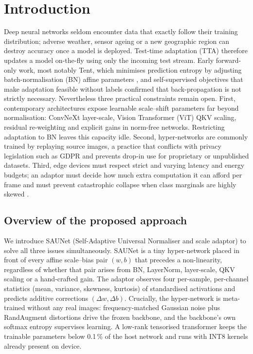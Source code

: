 \documentclass{article}
\begin{document}
\section{Introduction}
Deep neural networks seldom encounter data that exactly follow their training distribution; adverse weather, sensor ageing or a new geographic region can destroy accuracy once a model is deployed. Test-time adaptation (TTA) therefore updates a model on-the-fly using only the incoming test stream. Early forward-only work, most notably Tent, which minimises prediction entropy by adjusting batch-normalisation (BN) affine parameters \cite{wang-2020-tent}, and self-supervised objectives that make adaptation feasible without labels \cite{sun-2019-test} confirmed that back-propagation is not strictly necessary. Nevertheless three practical constraints remain open. First, contemporary architectures expose learnable scale–shift parameters far beyond normalisation: ConvNeXt layer-scale, Vision Transformer (ViT) QKV scaling, residual re-weighting and explicit gains in norm-free networks. Restricting adaptation to BN leaves this capacity idle. Second, hyper-networks are commonly trained by replaying source images, a practice that conflicts with privacy legislation such as GDPR and prevents drop-in use for proprietary or unpublished datasets. Third, edge devices must respect strict and varying latency and energy budgets; an adaptor must decide how much extra computation it can afford per frame and must prevent catastrophic collapse when class marginals are highly skewed \cite{alfarra-2023-evaluation}.

\subsection{Overview of the proposed approach}
We introduce SAUNet (Self-Adaptive Universal Normaliser and scale adaptor) to solve all three issues simultaneously. SAUNet is a tiny hyper-network placed in front of every affine scale–bias pair \((w,b)\) that precedes a non-linearity, regardless of whether that pair arises from BN, LayerNorm, layer-scale, QKV scaling or a hand-crafted gain. The adaptor observes four per-sample, per-channel statistics (mean, variance, skewness, kurtosis) of standardised activations and predicts additive corrections \((\Delta w, \Delta b)\). Crucially, the hyper-network is meta-trained without any real images: frequency-matched Gaussian noise plus RandAugment distortions drive the frozen backbone, and the backbone’s own softmax entropy supervises learning. A low-rank tensorised transformer keeps the trainable parameters below 0.1\,\% of the host network and runs with INT8 kernels already present on device.
\end{document}
